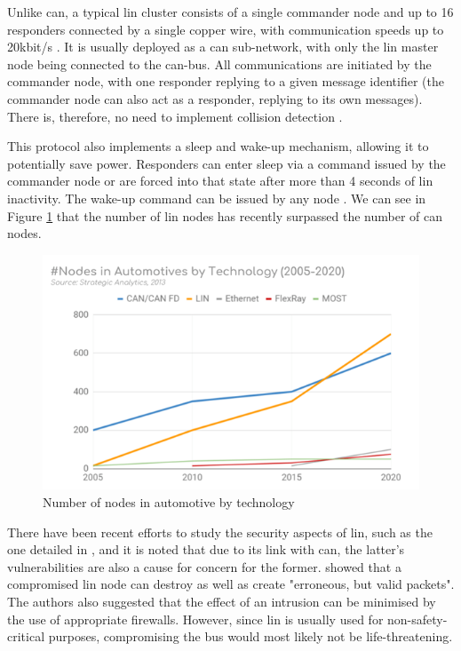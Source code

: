 Unlike \gls{can}, a typical \gls{lin} cluster consists of a single commander node and up to 16 responders connected by a single copper wire, with communication speeds up to 20kbit/s \citep{Takahashi2017}. It is usually deployed as a \gls{can} sub-network, with only the \gls{lin} master node being connected to the \gls{can}-bus. All communications are initiated by the commander node, with one responder replying to a given message identifier (the commander node can also act as a responder, replying to its own messages). There is, therefore, no need to implement collision detection \citep{LIN_CSS}.\par

This protocol also implements a sleep and wake-up mechanism, allowing it to potentially save power. Responders can enter sleep via a command issued by the commander node or are forced into that state after more than 4 seconds of \gls{lin} inactivity. The wake-up command can be issued by any node \citep{LIN}.
We can see in Figure \ref{fig:auto_nodes} that the number of \gls{lin} nodes has recently surpassed the number of \gls{can} nodes.

\begin{figure}
    \centering
    \includegraphics{img/parts/introduction/LIN Nodes.png}
    \caption{Number of nodes in automotive by technology \citep{LIN_CSS}}
    \label{fig:auto_nodes}
\end{figure}

There have been recent efforts to study the security aspects of \gls{lin}, such as the one detailed in \citep{Takahashi2017}, and it is noted that due to its link with \gls{can}, the latter’s vulnerabilities are also a cause for concern for the former. \citep{Ernst2018} showed that a compromised \gls{lin} node can destroy as well as create "erroneous, but valid packets". The authors also suggested that the effect of an intrusion can be minimised by the use of appropriate firewalls. However, since \gls{lin} is usually used for non-safety-critical purposes, compromising the bus would most likely not be life-threatening.

